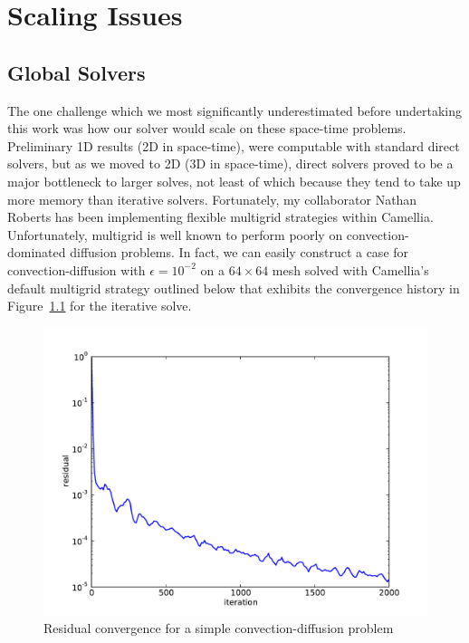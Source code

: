 \documentclass[Dissertation.tex]{subfiles}
\begin{document}
\graphicspath{{../Figures/}}
\chapter{Scaling Issues}
\label{sec:Scaling}

\section{Global Solvers}
The one challenge which we most significantly underestimated before undertaking this work 
was how our solver would scale on these space-time problems.
Preliminary 1D results (2D in space-time), were computable with standard direct solvers,
but as we moved to 2D (3D in space-time), direct solvers proved to be a major bottleneck
to larger solves, not least of which because they tend to take up more memory than iterative solvers.
Fortunately, my collaborator Nathan Roberts has been implementing 
flexible multigrid strategies within Camellia.
Unfortunately, multigrid is well known to perform poorly on convection-dominated diffusion problems.
In fact, we can easily construct a case for convection-diffusion with $\epsilon=10^{-2}$ on a $64\times64$
mesh solved with Camellia's default multigrid strategy outlined below that
exhibits the convergence history in Figure~\ref{fig:ConfusionResidual} for the iterative solve.
\begin{figure}[!ht]
\centering
\includegraphics[width=\textwidth]{Dissertation/Scaling/ConfusionResidual.pdf}
\caption{Residual convergence for a simple convection-diffusion problem}
\label{fig:ConfusionResidual}
\end{figure}
\end{document}

